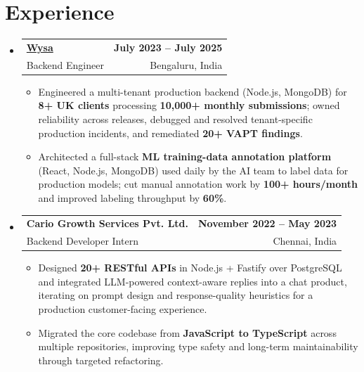 \documentclass[letterpaper,10pt]{article}
\makeatletter
\newcommand{\resumeItem}[1]{
  \item\small{#1\vspace{-1pt}}
}
\newcommand{\resumeSubheading}[4]{
  \vspace{1pt}\item
    \begin{tabular*}{0.985\textwidth}[t]{l@{\extracolsep{\fill}}r}
      \textbf{#1} & \textbf{\small #2} \\
      {\small\color{ResumeSlate} #3} & {\small\color{ResumeSlate} #4} \\
    \end{tabular*}\vspace{-6pt}
}
\newcommand{\resumeSubHeadingListStart}{\begin{itemize}[leftmargin=0.0in, label={}, itemsep=2pt, topsep=2pt]}
\newcommand{\resumeSubHeadingListEnd}{\end{itemize}}
\newcommand{\resumeItemListStart}{\begin{itemize}[leftmargin=0.18in, itemsep=2pt, topsep=1pt]}
\newcommand{\resumeItemListEnd}{\end{itemize}\vspace{-4pt}}
\makeatother
\begin{document}
\section{Experience}
\resumeSubHeadingListStart
  \resumeSubheading
    {\href{https://www.wysa.io}{Wysa}}{July 2023 -- July 2025}
    {Backend Engineer}{Bengaluru, India}
    \resumeItemListStart
      \resumeItem{Engineered a multi-tenant production backend (Node.js, MongoDB) for \textbf{8+ UK clients} processing \textbf{10{,}000+ monthly submissions}; owned reliability across releases, debugged and resolved tenant-specific production incidents, and remediated \textbf{20+ VAPT findings}.}
      \resumeItem{Architected a full-stack \textbf{ML training-data annotation platform} (React, Node.js, MongoDB) used daily by the AI team to label data for production models; cut manual annotation work by \textbf{100+ hours/month} and improved labeling throughput by \textbf{60\%}.}
    \resumeItemListEnd
  \resumeSubheading
    {Cario Growth Services Pvt. Ltd.}{November 2022 -- May 2023}
    {Backend Developer Intern}{Chennai, India}
    \resumeItemListStart
      \resumeItem{Designed \textbf{20+ RESTful APIs} in Node.js + Fastify over PostgreSQL and integrated LLM-powered context-aware replies into a chat product, iterating on prompt design and response-quality heuristics for a production customer-facing experience.}
      \resumeItem{Migrated the core codebase from \textbf{JavaScript to TypeScript} across multiple repositories, improving type safety and long-term maintainability through targeted refactoring.}
    \resumeItemListEnd
\resumeSubHeadingListEnd
\vspace{-4pt}
\end{document}
